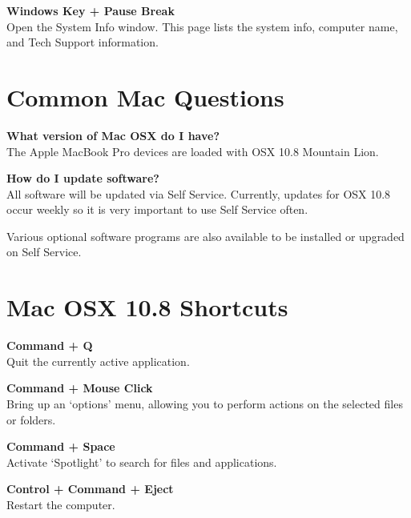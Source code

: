 \documentclass[10pt,foldmark,notumble]{leaflet}
\begin{document}
\textbf{Windows Key + Pause Break}\\
Open the System Info window. This page lists the system info, computer name, and Tech Support information.

\section{Common Mac Questions\color{red}\hrulefill\color{black}}
\textbf{What version of Mac OSX do I have?}\\
The Apple MacBook Pro devices are loaded with OSX 10.8 Mountain Lion. 

\textbf{How do I update software?}\\
All software will be updated via Self Service. Currently, updates for OSX 10.8 occur weekly so it is very important to use Self Service often.

Various optional software programs are also available to be installed or upgraded on Self Service.



\section{Mac OSX 10.8 Shortcuts\color{red}\hrulefill\color{black}}
\textbf{Command + Q}\\
Quit the currently active application. %

\textbf{Command + Mouse Click}\\
Bring up an `options' menu, allowing you to perform actions on the selected files or folders.

\textbf{Command + Space}\\
Activate `Spotlight' to search for files and applications.

\textbf{Control + Command + Eject}\\
Restart the computer.
\end{document}

